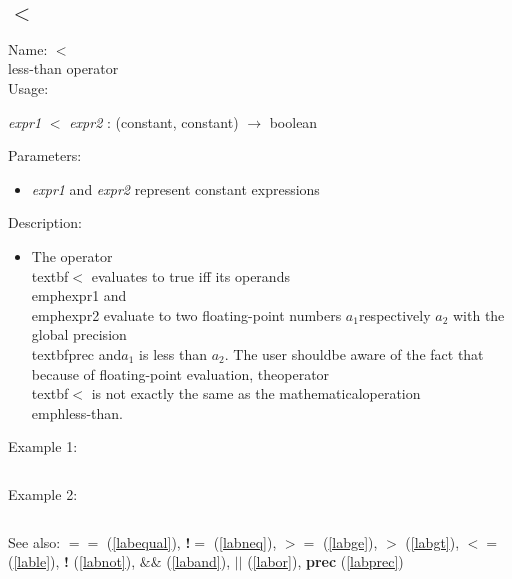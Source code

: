 \subsection{$<$}
\label{lablt}
\noindent Name: \textbf{$<$}\\
less-than operator\\
\noindent Usage: 
\begin{center}
\emph{expr1} \textbf{$<$} \emph{expr2} : (\textsf{constant}, \textsf{constant}) $\rightarrow$ \textsf{boolean}\\
\end{center}
Parameters: 
\begin{itemize}
\item \emph{expr1} and \emph{expr2} represent constant expressions
\end{itemize}
\noindent Description: \begin{itemize}

\item The operator \\textbf{$<$} evaluates to true iff its operands \\emph{expr1} and\n   \\emph{expr2} evaluate to two floating-point numbers $a_1$\n   respectively $a_2$ with the global precision \\textbf{prec} and\n   $a_1$ is less than $a_2$. The user should\n   be aware of the fact that because of floating-point evaluation, the\n   operator \\textbf{$<$} is not exactly the same as the mathematical\n   operation \\emph{less-than}.\n\end{itemize}
\noindent Example 1: 
\begin{center}\begin{minipage}{15cm}\begin{Verbatim}[frame=single]
\end{Verbatim}
\end{minipage}\end{center}
\noindent Example 2: 
\begin{center}\begin{minipage}{15cm}\begin{Verbatim}[frame=single]
\end{Verbatim}
\end{minipage}\end{center}
See also: \textbf{$==$} (\ref{labequal}), \textbf{!$=$} (\ref{labneq}), \textbf{$>=$} (\ref{labge}), \textbf{$>$} (\ref{labgt}), \textbf{$<=$} (\ref{lable}), \textbf{!} (\ref{labnot}), \textbf{$\&\&$} (\ref{laband}), \textbf{$||$} (\ref{labor}), \textbf{prec} (\ref{labprec})
